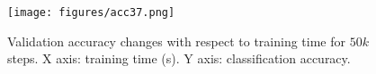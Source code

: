 \begin{figure}[htbp]
\centering
\texttt{[image: figures/acc37.png]}
\caption{
Validation accuracy changes with respect to training time for $50k$ steps. X axis: training time (s). Y axis: classification accuracy.
}
\label{fig:devacc}
\end{figure}